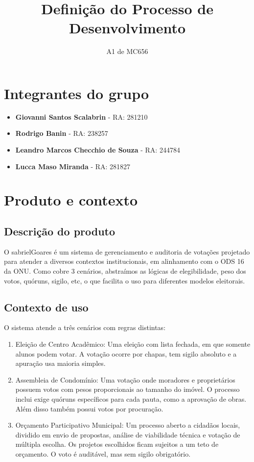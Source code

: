 \documentclass[12pt,a4paper]{article}
\title{\textbf{Definição do Processo de Desenvolvimento}}
\author{A1 de MC656}
\date{}
\begin{document}
\maketitle

\section{Integrantes do grupo}
\begin{itemize}
    \item \textbf{Giovanni Santos Scalabrin} - RA: 281210
    \item \textbf{Rodrigo Banin} - RA: 238257
    \item \textbf{Leandro Marcos Checchio de Souza} - RA: 244784
    \item \textbf{Lucca Maso Miranda} - RA: 281827
\end{itemize}

\section{Produto e contexto}
\subsection{Descrição do produto}
O sabrielGoares é um sistema de gerenciamento e auditoria de votações projetado para atender a diversos contextos institucionais, em alinhamento com o ODS 16 da ONU. Como cobre 3 cenários, abstraímos as lógicas de elegibilidade, peso dos votos, quóruns, sigilo, etc, o que facilita o uso para diferentes modelos eleitorais.

\subsection{Contexto de uso}
O sistema atende a três cenários com regras distintas:
\begin{enumerate}
    \item Eleição de Centro Acadêmico: Uma eleição com lista fechada, em que somente alunos podem votar. A votação ocorre por chapas, tem sigilo absoluto e a apuração usa maioria simples.
    \item Assembleia de Condomínio: Uma votação onde moradores e proprietários possuem votos com pesos proporcionais ao tamanho do imóvel. O processo inclui exige quóruns específicos para cada pauta, como a aprovação de obras. Além disso também possui votos por procuração.
    \item Orçamento Participativo Municipal: Um processo aberto a cidadãos locais, dividido em envio de propostas, análise de viabilidade técnica e votação de múltipla escolha. Os projetos escolhidos ficam sujeitos a um teto de orçamento. O voto é auditável, mas sem sigilo obrigatório.
\end{enumerate}
\end{document}
